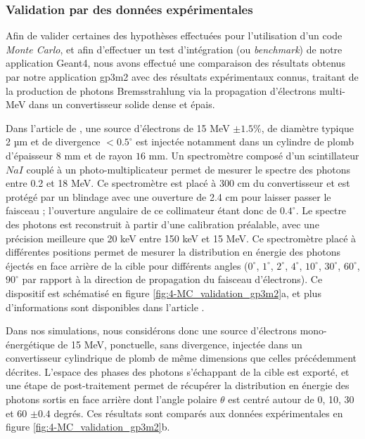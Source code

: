\begin{refsection}
\subsubsection{Validation par des données expérimentales}

Afin de valider certaines des hypothèses effectuées pour l'utilisation d'un code \textit{Monte Carlo}, et afin d'effectuer un test d'intégration (ou \textit{benchmark}) de notre application Geant4, nous avons effectué une comparaison des résultats obtenus par notre application gp3m2 avec des résultats expérimentaux connus, traitant de la production de photons Bremsstrahlung via la propagation d'électrons multi-MeV dans un convertisseur solide dense et épais.


Dans l'article de \cite{faddegon_1991}, une source d'électrons de 15 MeV $\pm 1.5 \%$, de diamètre typique 2 µm et de divergence $< 0.5^\circ$ est injectée notamment dans un cylindre de plomb d'épaisseur $8$ mm et de rayon $16$ mm. Un spectromètre composé d'un scintillateur $NaI$ couplé à un photo-multiplicateur permet de mesurer le spectre des photons entre 0.2 et 18 MeV. Ce spectromètre est placé à 300 cm du convertisseur et est protégé par un blindage avec une ouverture de 2.4 cm pour laisser passer le faisceau ; l'ouverture angulaire de ce collimateur étant donc de $0.4^\circ$. Le spectre des photons est reconstruit à partir d'une calibration préalable, avec une précision meilleure que 20 keV entre 150 keV et 15 MeV. Ce spectromètre placé à différentes positions permet de mesurer la distribution en énergie des photons éjectés en face arrière de la cible pour différents angles ($0^\circ$, $1^\circ$, $2^\circ$, $4^\circ$, $10^\circ$, $30^\circ$, $60^\circ$, $90^\circ$ par rapport à la direction de propagation du faisceau d'électrons). Ce dispositif est schématisé en figure \ref{fig:4-MC_validation_gp3m2}a, et plus d'informations sont disponibles dans l'article \parencite{faddegon_1991}.

Dans nos simulations, nous considérons donc une source d'électrons mono-énergétique de 15 MeV, ponctuelle, sans divergence, injectée dans un convertisseur cylindrique de plomb de même dimensions que celles précédemment décrites. L'espace des phases des photons s'échappant de la cible est exporté, et une étape de post-traitement permet de récupérer la distribution en énergie des photons sortis en face arrière dont l'angle polaire $\theta$ est centré autour de 0, 10, 30 et 60 $\pm 0.4$ degrés. Ces résultats sont comparés aux données expérimentales en figure \ref{fig:4-MC_validation_gp3m2}b.


\end{refsection}
